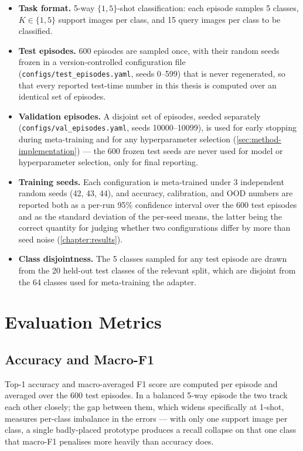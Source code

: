 \documentclass{iutbscthesis}
\begin{document}
\begin{itemize}
    \item \textbf{Task format.} 5-way $\{1, 5\}$-shot classification: each episode samples 5 classes, $K \in \{1, 5\}$ support images per class, and 15 query images per class to be classified.
    \item \textbf{Test episodes.} 600 episodes are sampled once, with their random seeds frozen in a version-controlled configuration file (\texttt{configs/test\_episodes.yaml}, seeds 0--599) that is never regenerated, so that every reported test-time number in this thesis is computed over an identical set of episodes.
    \item \textbf{Validation episodes.} A disjoint set of episodes, seeded separately (\texttt{configs/val\_episodes.yaml}, seeds 10000--10099), is used for early stopping during meta-training and for any hyperparameter selection (\autoref{sec:method-implementation}) — the 600 frozen test seeds are never used for model or hyperparameter selection, only for final reporting.
    \item \textbf{Training seeds.} Each configuration is meta-trained under 3 independent random seeds (42, 43, 44), and accuracy, calibration, and OOD numbers are reported both as a per-run 95\% confidence interval over the 600 test episodes and as the standard deviation of the per-seed means, the latter being the correct quantity for judging whether two configurations differ by more than seed noise (\autoref{chapter:results}).
    \item \textbf{Class disjointness.} The 5 classes sampled for any test episode are drawn from the 20 held-out test classes of the relevant split, which are disjoint from the 64 classes used for meta-training the adapter.
\end{itemize}

\section{Evaluation Metrics}
\label{sec:proto-metrics}

\subsection{Accuracy and Macro-F1}

Top-1 accuracy and macro-averaged F1 score are computed per episode and averaged over the 600 test episodes. In a balanced 5-way episode the two track each other closely; the gap between them, which widens specifically at 1-shot, measures per-class imbalance in the errors — with only one support image per class, a single badly-placed prototype produces a recall collapse on that one class that macro-F1 penalises more heavily than accuracy does.
\end{document}
